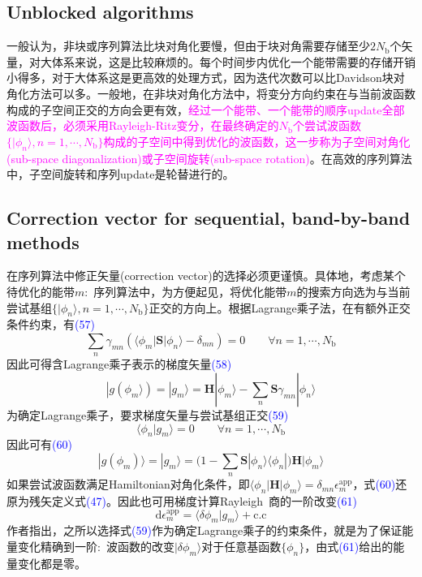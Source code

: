 \documentclass[14pt]{article}      %
\begin{document}
\subsection{Unblocked algorithms}
一般认为，非块或序列算法比块对角化要慢，但由于块对角需要存储至少$2N_{\mathrm{b}}$个矢量，对大体系来说，这是比较麻烦的。每个时间步内优化一个能带需要的存储开销小得多，对于大体系这是更高效的处理方式，因为迭代次数可以比\textrm{Davidson}块对角化方法可以多。一般地，在非块对角化方法中，将变分方向约束在与当前波函数构成的子空间正交的方向会更有效，\textcolor{magenta}{经过一个能带、一个能带的顺序\textrm{update}全部波函数后，必须采用\textrm{Rayleigh-Ritz}变分，在最终确定的$N_{\mathrm{b}}$个尝试波函数$\{|\phi_n\rangle,n=1,\cdots,N_{\mathrm{b}}\}$构成的子空间中得到优化的波函数，这一步称为子空间对角化(\textrm{sub-space diagonalization})或子空间旋转(\textrm{sub-space rotation})}。在高效的序列算法中，子空间旋转和序列\textrm{update}是轮替进行的。

\subsection{Correction vector for sequential, band-by-band methods}
在序列算法中修正矢量(correction vector)的选择必须更谨慎。具体地，考虑某个待优化的能带$m$:~序列算法中，为方便起见，将优化能带$m$的搜索方向选为与当前尝试基组$\{|\phi_n\rangle,n=1,\cdots,N_{\mathrm{b}}\}$正交的方向上。根据\textrm{Lagrange}乘子法，在有额外正交条件约束，有\textcolor{blue}{(57)}
\begin{displaymath}
	\sum_n\gamma_{mn}(\langle\phi_m|\mathbf{S}|\phi_n\rangle-\delta_{mn})=0\qquad\forall n=1,\cdots,N_{\mathrm{b}}
\end{displaymath}
因此可得含\textrm{Lagrange}乘子表示的梯度矢量\textcolor{blue}{(58)}
\begin{displaymath}
	|g(\phi_m\rangle)=|g_m\rangle=\mathbf{H}|\phi_m\rangle-\sum_n\mathbf{S}\gamma_{mn}|\phi_n\rangle
\end{displaymath}
为确定\textrm{Lagrange}乘子，要求梯度矢量与尝试基组正交\textcolor{blue}{(59)}
\begin{displaymath}
	\langle\phi_n|g_m\rangle=0\qquad\forall n=1,\cdots,N_{\mathrm{b}}
\end{displaymath}
因此可有\textcolor{blue}{(60)}
\begin{displaymath}
	|g(\phi_m)\rangle=|g_m\rangle=\bigg(1-\sum_n\mathbf{S}|\phi_n\rangle\langle\phi_n|\bigg)\mathbf{H}|\phi_m\rangle
\end{displaymath}
如果尝试波函数满足\textrm{Hamiltonian}对角化条件，即$\langle\phi_n|\mathbf{H}|\phi_m\rangle=\delta_{mn}\epsilon_{m}^{\mathrm{app}}$，式\textcolor{blue}{(60)}还原为残矢定义式\textcolor{blue}{(47)}。因此也可用梯度计算\textrm{Rayleigh~}商的一阶改变\textcolor{blue}{(61)}
\begin{displaymath}
	\mathrm{d}\epsilon_m^{\mathrm{app}}=\langle\delta\phi_m|g_m\rangle+\mathrm{c.c}
\end{displaymath}
作者指出，之所以选择式\textcolor{blue}{(59)}作为确定\textrm{Lagrange}乘子的约束条件，就是为了保证能量变化精确到一阶:~波函数的改变$|\delta\phi_m\rangle$对于任意基函数$\{\phi_n\}$，由式\textcolor{blue}{(61)}给出的能量变化都是零。
\end{document}
